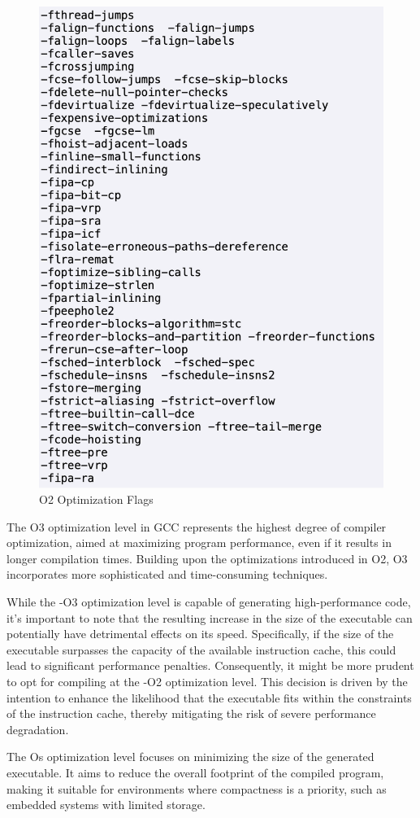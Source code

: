 \documentclass[conference]{IEEEtran}
\begin{document}
\begin{figure}[htbp]
\centering
\includegraphics [width=0.7\linewidth]{pictures/o2.png}
\caption{O2 Optimization Flags\cite{b2}}
\label{fig3}
\end{figure}

The O3 optimization level in GCC represents the highest degree of compiler optimization, aimed at maximizing program performance, even if it results in longer compilation times. Building upon the optimizations introduced in O2, O3 incorporates more sophisticated and time-consuming techniques.

While the -O3 optimization level is capable of generating high-performance code, it's important to note that the resulting increase in the size of the executable can potentially have detrimental effects on its speed. Specifically, if the size of the executable surpasses the capacity of the available instruction cache, this could lead to significant performance penalties. Consequently, it might be more prudent to opt for compiling at the -O2 optimization level. This decision is driven by the intention to enhance the likelihood that the executable fits within the constraints of the instruction cache, thereby mitigating the risk of severe performance degradation.

The Os optimization level focuses on minimizing the size of the generated executable. It aims to reduce the overall footprint of the compiled program, making it suitable for environments where compactness is a priority, such as embedded systems with limited storage.
\end{document}
